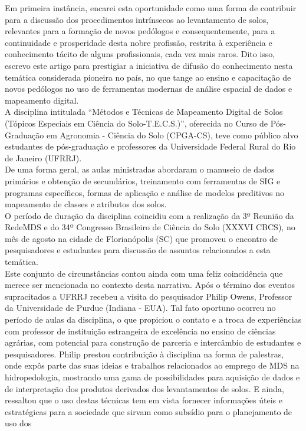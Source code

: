 Em primeira instância, encarei esta oportunidade como uma forma de contribuir para a discussão dos procedimentos intrínsecos ao levantamento de solos, relevantes para a formação de novos pedólogos e consequentemente, para a continuidade e prosperidade desta nobre profissão, restrita à experiência e conhecimento tácito de alguns profissionais, cada vez mais raros. Dito isso, escrevo este artigo para prestigiar a iniciativa de difusão do conhecimento nesta temática considerada pioneira no país, no que tange ao ensino e capacitação de novos pedólogos no uso de ferramentas modernas de análise espacial de dados e mapeamento digital.\\
A disciplina intitulada ``Métodos e Técnicas de Mapeamento Digital de Solos (Tópicos Especiais em Ciência do Solo-T.E.C.S.)'', oferecida no Curso de Pós-Graduação em Agronomia - Ciência do Solo (CPGA-CS), teve como público alvo estudantes de pós-graduação e professores da Universidade Federal Rural do Rio de Janeiro (UFRRJ).\\
De uma forma geral, as aulas ministradas abordaram o manuseio de dados primários e obtenção de secundários, treinamento com ferramentas de SIG e programas específicos, formas de aplicação e análise de modelos preditivos no mapeamento de classes e atributos dos solos.\\
O período de duração da disciplina coincidiu com a realização da 3º Reunião da RedeMDS e do 34º Congresso Brasileiro de Ciência do Solo (XXXVI CBCS), no mês de agosto na cidade de Florianópolis (SC) que promoveu o encontro de pesquisadores e estudantes para discussão de assuntos relacionados a esta temática.\\
Este conjunto de circunstâncias contou ainda com uma feliz coincidência que merece ser mencionada no contexto desta narrativa. Após o término dos eventos supracitados a UFRRJ recebeu a visita do pesquisador Philip Owens, Professor da Universidade de Purdue (Indiana - EUA). Tal fato oportuno ocorreu no período de aulas da disciplina, o que propiciou o contato e a troca de experiências com professor de instituição estrangeira de excelência no ensino de ciências agrárias, com potencial para construção de parceria e intercâmbio de estudantes e pesquisadores. Philip prestou contribuição à disciplina na forma de palestras, onde expôs parte das suas ideias e trabalhos relacionados ao emprego de MDS na hidropedologia, mostrando uma gama de possibilidades para aquisição de dados e de interpretação dos produtos derivados dos levantamentos de solos. E ainda, ressaltou que o uso destas técnicas tem em vista fornecer informações úteis e estratégicas para a sociedade que sirvam como subsídio para o planejamento de uso dos 
